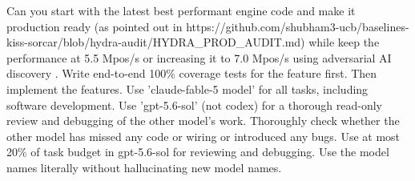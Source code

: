 \documentclass{article}
\newenvironment{promptbox}{\begin{mdframed}[linewidth=0.4pt,linecolor=black,innerleftmargin=5pt,innerrightmargin=5pt,innertopmargin=5pt,innerbottommargin=5pt,skipabove=2pt,skipbelow=5pt]\setlength{\parskip}{0pt}\setlength{\parindent}{0pt}\ttfamily\scriptsize\raggedright\frenchspacing\obeylines\leavevmode\strut\ignorespaces}{\end{mdframed}}
\begin{document}
\begin{promptbox}
Can you start with the latest best performant engine code and make it production ready (as pointed out in https://github.com/shubham3-ucb/baselines-kiss-sorcar/blob/hydra-audit/HYDRA\_PROD\_AUDIT.md) while keep the performance at 5.5 Mpos/s or increasing it to 7.0 Mpos/s using adversarial AI discovery .  Write end-to-end 100\% coverage tests for the feature first.  Then implement the features.  Use 'claude-fable-5 model' for all tasks, including software development. Use 'gpt-5.6-sol' (not codex) for a thorough read-only review and debugging of the other model's work. Thoroughly check whether the other model has missed any code or wiring or introduced any bugs. Use at most 20\% of task budget in gpt-5.6-sol for reviewing and debugging. Use the model names literally without hallucinating new model names.
\end{promptbox}
\end{document}
